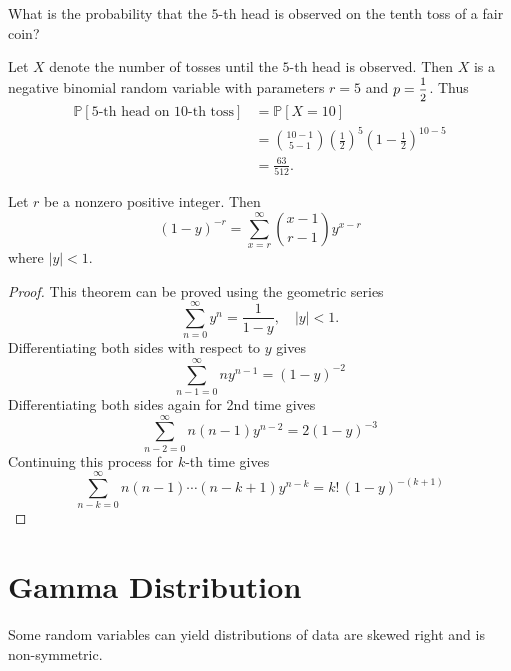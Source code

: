 \begin{example}
    What is the probability that the $5$-th head is observed on the 
    tenth toss of a fair coin?
\end{example}
\begin{solution}
    Let $X$ denote the number of tosses until the $5$-th head is observed. 
    Then $X$ is a negative binomial random variable with parameters $r = 5$ 
    and $p = \mfrac{1}{2}$. Thus
    \begin{align*}
        \mathbb{P}[\text{5-th head on 10-th toss}] &= \mathbb{P}[X = 10]\\
        &= { 10 - 1 \choose 5 - 1} \left( \frac{1}{2} \right)^5 \left( 1 - \frac{1}{2} \right)^{10-5}\\
        &= \frac{63}{512}.
    \end{align*}
\end{solution}

\begin{theorem}
    Let $r$ be a nonzero positive integer. Then 
    \begin{equation}
        (1 - y)^{-r} = \sum^\infty_{x = r} {x-1 \choose r-1} y^{x-r}
    \end{equation}
    where $|y| < 1$.
\end{theorem}
\begin{proof}
    This theorem can be proved using the geometric series 
    \begin{equation}
        \sum^\infty_{n=0} y^n = \frac{1}{1-y}, \quad |y| < 1.
    \end{equation}
    Differentiating both sides with respect to $y$ gives
    \begin{equation}
        \sum^\infty_{n-1=0} n y^{n-1} = (1-y)^{-2}
    \end{equation}
    Differentiating both sides again for 2nd time gives
    \begin{equation}
        \sum^\infty_{n-2=0} n(n-1) y^{n-2} = 2(1-y)^{-3}
    \end{equation}
    Continuing this process for $k$-th time gives
    \[
        \sum^\infty_{n-k=0} n(n-1)\cdots(n-k+1) y^{n-k} = k!\, (1-y)^{-(k+1)}
    \]
\end{proof}

\section{Gamma Distribution}

Some random variables can yield distributions of data are skewed right and is non-symmetric.

